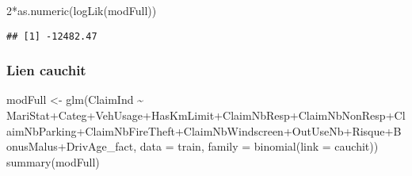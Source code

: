 \documentclass[
]{article}
\newenvironment{Shaded}{\begin{snugshade}}{\end{snugshade}}
\newcommand{\AttributeTok}[1]{\textcolor[rgb]{0.77,0.63,0.00}{#1}}
\newcommand{\DecValTok}[1]{\textcolor[rgb]{0.00,0.00,0.81}{#1}}
\newcommand{\FunctionTok}[1]{\textcolor[rgb]{0.00,0.00,0.00}{#1}}
\newcommand{\NormalTok}[1]{#1}
\newcommand{\OtherTok}[1]{\textcolor[rgb]{0.56,0.35,0.01}{#1}}
\newcommand{\SpecialCharTok}[1]{\textcolor[rgb]{0.00,0.00,0.00}{#1}}
\begin{document}
\begin{Shaded}
\begin{Highlighting}[]
\DecValTok{2}\SpecialCharTok{*}\FunctionTok{as.numeric}\NormalTok{(}\FunctionTok{logLik}\NormalTok{(modFull))}
\end{Highlighting}
\end{Shaded}

\begin{verbatim}
## [1] -12482.47
\end{verbatim}

\hypertarget{lien-cauchit}{%
\subsubsection{Lien cauchit}\label{lien-cauchit}}

\begin{Shaded}
\begin{Highlighting}[]
\NormalTok{modFull }\OtherTok{\textless{}{-}} \FunctionTok{glm}\NormalTok{(ClaimInd }\SpecialCharTok{\textasciitilde{}}\NormalTok{ MariStat}\SpecialCharTok{+}\NormalTok{Categ}\SpecialCharTok{+}\NormalTok{VehUsage}\SpecialCharTok{+}\NormalTok{HasKmLimit}\SpecialCharTok{+}\NormalTok{ClaimNbResp}\SpecialCharTok{+}\NormalTok{ClaimNbNonResp}\SpecialCharTok{+}\NormalTok{ClaimNbParking}\SpecialCharTok{+}\NormalTok{ClaimNbFireTheft}\SpecialCharTok{+}\NormalTok{ClaimNbWindscreen}\SpecialCharTok{+}\NormalTok{OutUseNb}\SpecialCharTok{+}\NormalTok{Risque}\SpecialCharTok{+}\NormalTok{BonusMalus}\SpecialCharTok{+}\NormalTok{DrivAge\_fact, }\AttributeTok{data =}\NormalTok{ train, }\AttributeTok{family =} \FunctionTok{binomial}\NormalTok{(}\AttributeTok{link =}\NormalTok{ cauchit))}
\FunctionTok{summary}\NormalTok{(modFull)}
\end{Highlighting}
\end{Shaded}
\end{document}
